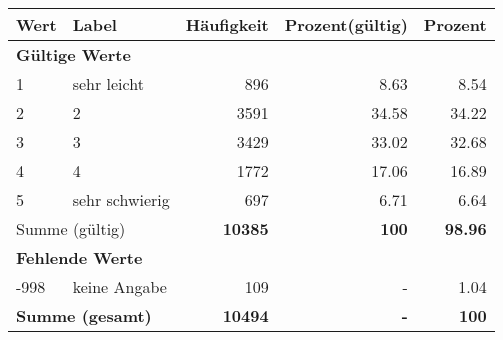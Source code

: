      \begin{longtable}{lXrrr}
     \toprule
     \textbf{Wert} & \textbf{Label} & \textbf{Häufigkeit} & \textbf{Prozent(gültig)} & \textbf{Prozent} \\
     \endhead
     \midrule
     \multicolumn{5}{l}{\textbf{Gültige Werte}}\\

     1 &
     \multicolumn{1}{X}{ sehr leicht   } &


       \num{896} &
       \num[round-mode=places,round-precision=2]{8,63} &
         \num[round-mode=places,round-precision=2]{8,54} \\

     2 &
     \multicolumn{1}{X}{ 2   } &


       \num{3591} &
       \num[round-mode=places,round-precision=2]{34,58} &
         \num[round-mode=places,round-precision=2]{34,22} \\

     3 &
     \multicolumn{1}{X}{ 3   } &


       \num{3429} &
       \num[round-mode=places,round-precision=2]{33,02} &
         \num[round-mode=places,round-precision=2]{32,68} \\

     4 &
     \multicolumn{1}{X}{ 4   } &


       \num{1772} &
       \num[round-mode=places,round-precision=2]{17,06} &
         \num[round-mode=places,round-precision=2]{16,89} \\

     5 &
     \multicolumn{1}{X}{ sehr schwierig   } &


       \num{697} &
       \num[round-mode=places,round-precision=2]{6,71} &
         \num[round-mode=places,round-precision=2]{6,64} \\
     \midrule
     \multicolumn{2}{l}{Summe (gültig)} &
       \textbf{\num{10385}} &
     \textbf{100} &
       \textbf{\num[round-mode=places,round-precision=2]{98,96}} \\
     \multicolumn{5}{l}{\textbf{Fehlende Werte}}\\
       -998 &
       keine Angabe &
         \num{109} &
        - &
         \num[round-mode=places,round-precision=2]{1,04} \\
     \midrule
     \multicolumn{2}{l}{\textbf{Summe (gesamt)}} &
          \textbf{\num{10494}} &
        \textbf{-} &
        \textbf{100} \\
     \bottomrule
     \end{longtable}
     
